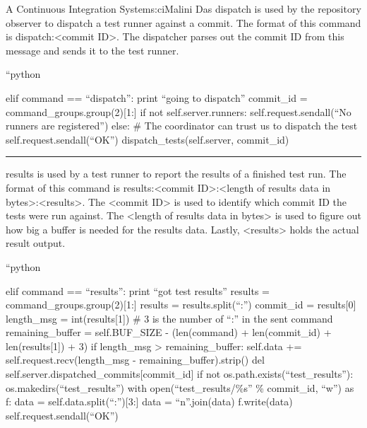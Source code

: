 \begin{aosachapter}{A Continuous Integration System}{s:ci}{Malini Das}
dispatch is used by the repository observer to dispatch a test runner
against a commit. The format of this command is
dispatch:\textless{}commit ID\textgreater{}. The dispatcher parses out
the commit ID from this message and sends it to the test runner.

\begin{aosadescription}
\item[``python]
\begin{aosadescription}

\item[elif command == ``dispatch'':]
print ``going to dispatch'' commit\_id =
command\_groups.group(2){[}1:{]} if not self.server.runners:
self.request.sendall(``No runners are registered'') else: \# The
coordinator can trust us to dispatch the test
self.request.sendall(``OK'') dispatch\_tests(self.server, commit\_id)
\end{aosadescription}
\end{aosadescription}

\begin{center}\rule{3in}{0.4pt}\end{center}

results is used by a test runner to report the results of a finished
test run. The format of this command is results:\textless{}commit
ID\textgreater{}:\textless{}length of results data in
bytes\textgreater{}:\textless{}results\textgreater{}. The
\textless{}commit ID\textgreater{} is used to identify which commit ID
the tests were run against. The \textless{}length of results data in
bytes\textgreater{} is used to figure out how big a buffer is needed for
the results data. Lastly, \textless{}results\textgreater{} holds the
actual result output.

\begin{aosadescription}
\item[``python]
\begin{aosadescription}

\item[elif command == ``results'':]
print ``got test results'' results = command\_groups.group(2){[}1:{]}
results = results.split(``:'') commit\_id = results{[}0{]} length\_msg =
int(results{[}1{]}) \# 3 is the number of ``:'' in the sent command
remaining\_buffer = self.BUF\_SIZE - (len(command) + len(commit\_id) +
len(results{[}1{]}) + 3) if length\_msg \textgreater{}
remaining\_buffer: self.data += self.request.recv(length\_msg -
remaining\_buffer).strip() del
self.server.dispatched\_commits{[}commit\_id{]} if not
os.path.exists(``test\_results''): os.makedirs(``test\_results'') with
open(``test\_results/\%s'' \% commit\_id, ``w'') as f: data =
self.data.split(``:''){[}3:{]} data = ``n''.join(data) f.write(data)
self.request.sendall(``OK'')
\end{aosadescription}
\end{aosadescription}


\end{aosachapter}
